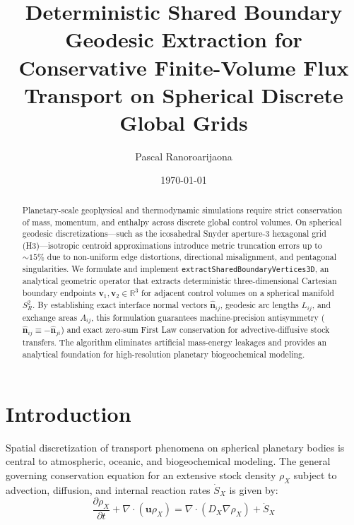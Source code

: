 \documentclass[twocolumn,10pt,amsmath,amssymb,aps,prl]{revtex4-2}
\begin{document}
\title{Deterministic Shared Boundary Geodesic Extraction for Conservative Finite-Volume Flux Transport on Spherical Discrete Global Grids}

\author{Pascal Ranoroarijaona}

\date{\today}

\begin{abstract}
Planetary-scale geophysical and thermodynamic simulations require strict conservation of mass, momentum, and enthalpy across discrete global control volumes. On spherical geodesic discretizations---such as the icosahedral Snyder aperture-3 hexagonal grid (H3)---isotropic centroid approximations introduce metric truncation errors up to $\sim 15\%$ due to non-uniform edge distortions, directional misalignment, and pentagonal singularities. We formulate and implement \texttt{extractSharedBoundaryVertices3D}, an analytical geometric operator that extracts deterministic three-dimensional Cartesian boundary endpoints $\mathbf{v}_1, \mathbf{v}_2 \in \mathbb{R}^3$ for adjacent control volumes on a spherical manifold $S_R^2$. By establishing exact interface normal vectors $\hat{\mathbf{n}}_{ij}$, geodesic arc lengths $L_{ij}$, and exchange areas $A_{ij}$, this formulation guarantees machine-precision antisymmetry ($\hat{\mathbf{n}}_{ij} \equiv -\hat{\mathbf{n}}_{ji}$) and exact zero-sum First Law conservation for advective-diffusive stock transfers. The algorithm eliminates artificial mass-energy leakages and provides an analytical foundation for high-resolution planetary biogeochemical modeling.
\end{abstract}

\maketitle

\section{Introduction}
Spatial discretization of transport phenomena on spherical planetary bodies is central to atmospheric, oceanic, and biogeochemical modeling. The general governing conservation equation for an extensive stock density $\rho_X$ subject to advection, diffusion, and internal reaction rates $\dot{S}_X$ is given by:
\begin{equation}
\frac{\partial \rho_X}{\partial t} + \nabla \cdot (\mathbf{u} \rho_X) = \nabla \cdot (D_X \nabla \rho_X) + \dot{S}_X
\label{eq:conservation_continuum}
\end{equation}
\end{document}
